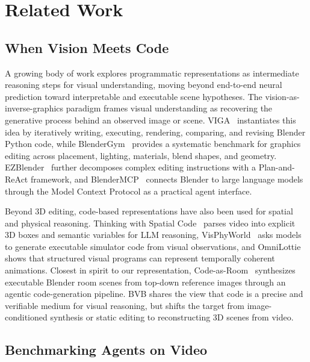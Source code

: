 \section{Related Work}
\label{sec:related_work}

\subsection{When Vision Meets Code}

A growing body of work explores programmatic representations as intermediate reasoning steps for visual understanding, moving beyond end-to-end neural prediction toward interpretable and executable scene hypotheses. The vision-as-inverse-graphics paradigm frames visual understanding as recovering the generative process behind an observed image or scene. VIGA~\cite{yin2026viga} instantiates this idea by iteratively writing, executing, rendering, comparing, and revising Blender Python code, while BlenderGym~\cite{gu2025blendergym} provides a systematic benchmark for graphics editing across placement, lighting, materials, blend shapes, and geometry. EZBlender~\cite{zhang2026ezblender} further decomposes complex editing instructions with a Plan-and-ReAct framework, and BlenderMCP~\cite{blendermcp2025} connects Blender to large language models through the Model Context Protocol as a practical agent interface.

Beyond 3D editing, code-based representations have also been used for spatial and physical reasoning. Thinking with Spatial Code~\cite{chen2026spatialcode} parses video into explicit 3D boxes and semantic variables for LLM reasoning, VisPhyWorld~\cite{visphyworld2026} asks models to generate executable simulator code from visual observations, and OmniLottie~\cite{yang2026omnilottie} shows that structured visual programs can represent temporally coherent animations. Closest in spirit to our representation, Code-as-Room~\cite{yang2026codeasroom} synthesizes executable Blender room scenes from top-down reference images through an agentic code-generation pipeline. BVB shares the view that code is a precise and verifiable medium for visual reasoning, but shifts the target from image-conditioned synthesis or static editing to reconstructing 3D scenes from video.

\subsection{Benchmarking Agents on Video}

